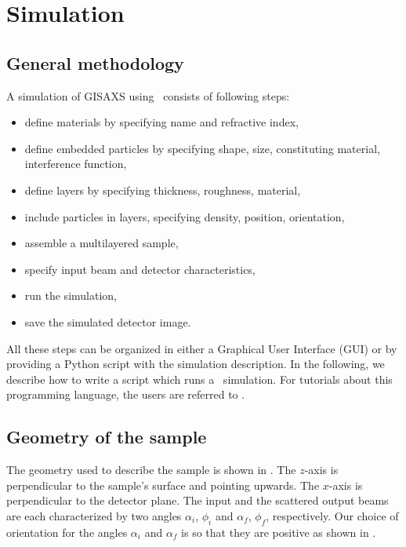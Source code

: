 \newpage
\chapter{Simulation}  

\section{General methodology}
A simulation of GISAXS using \BornAgain\ consists of following steps:
\begin{itemize}
\item define materials by specifying name and refractive index,
\item define embedded particles by specifying shape, size,
   constituting material, interference function,
\item define layers by specifying thickness, roughness, material,
\item include particles in layers, specifying density, position, orientation, 
\item assemble a multilayered sample,
\item specify input beam and detector characteristics,
\item run the simulation,
\item save the simulated detector image.
\end{itemize}

\noindent
All these steps can be organized in either a Graphical User Interface (GUI) or by providing a Python script with the simulation description. 
In the following, we describe how to write a 
 script which runs a \BornAgain\ simulation. For tutorials about this programming language, the users are referred to \cite{Lut09}.




\section{Geometry of the sample}

\noindent The geometry used to describe the sample is shown in . The $z$-axis is perpendicular to the sample's
surface and pointing upwards. The $x$-axis  is perpendicular to the
detector plane. The input and the
scattered output beams are each characterized by two angles
$\alpha_i$, $\phi_i$ and $\alpha_f$, $\phi_f$, respectively. Our choice of orientation for the
angles $\alpha_i$ and $\alpha_f$ is so that they are positive as shown in . \\

